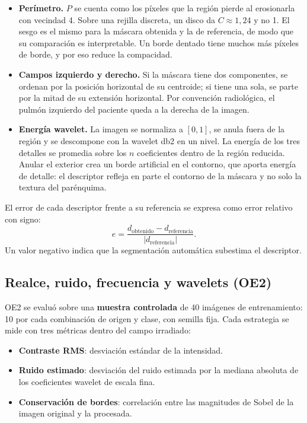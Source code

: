 \begin{itemize}
    \item \textbf{Perímetro.} $P$ se cuenta como los píxeles que la región pierde al
    erosionarla con vecindad 4. Sobre una rejilla discreta, un disco da $C \approx
    1{,}24$ y no 1. El sesgo es el mismo para la máscara obtenida y la de
    referencia, de modo que su comparación es interpretable. Un borde dentado
    tiene muchos más píxeles de borde, y por eso reduce la compacidad.
    \item \textbf{Campos izquierdo y derecho.} Si la máscara tiene dos componentes,
    se ordenan por la posición horizontal de su centroide; si tiene una sola, se
    parte por la mitad de su extensión horizontal. Por convención radiológica, el
    pulmón izquierdo del paciente queda a la derecha de la imagen.
    \item \textbf{Energía wavelet.} La imagen se normaliza a $[0,1]$, se anula fuera
    de la región y se descompone con la wavelet db2 en un nivel. La energía de
    los tres detalles se promedia sobre los $n$ coeficientes dentro de la región
    reducida. Anular el exterior crea un borde artificial en el contorno, que
    aporta energía de detalle: el descriptor refleja en parte el contorno de la
    máscara y no solo la textura del parénquima.
\end{itemize}

El error de cada descriptor frente a su referencia se expresa como error relativo
con signo:
\begin{equation}
e = \frac{d_{\text{obtenido}} - d_{\text{referencia}}}{|d_{\text{referencia}}|}.
\end{equation}
Un valor negativo indica que la segmentación automática subestima el descriptor.

\subsection{Realce, ruido, frecuencia y wavelets (OE2)}
\label{sec:met-oe2}

OE2 se evaluó sobre una \textbf{muestra controlada} de 40 imágenes de
entrenamiento: 10 por cada combinación de origen y clase, con semilla fija. Cada
estrategia se mide con tres métricas dentro del campo irradiado:

\begin{itemize}
    \item \textbf{Contraste RMS}: desviación estándar de la intensidad.
    \item \textbf{Ruido estimado}: desviación del ruido estimada por la mediana
    absoluta de los coeficientes wavelet de escala fina.
    \item \textbf{Conservación de bordes}: correlación entre las magnitudes de Sobel
    de la imagen original y la procesada.
\end{itemize}

